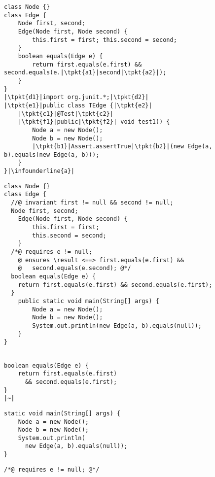 \newsavebox{\codefive}
\begin{lrbox}{\codefive}
	\begin{lstlisting}
class Node {}
class Edge {
	Node first, second;
	Edge(Node first, Node second) {
		this.first = first; this.second = second;
	}
	boolean equals(Edge e) {
		return first.equals(e.first) && second.equals(e.|\tpkt{a1}|second|\tpkt{a2}|);
	}
}
|\tpkt{d1}|import org.junit.*;|\tpkt{d2}|
|\tpkt{e1}|public class TEdge {|\tpkt{e2}|
	|\tpkt{c1}|@Test|\tpkt{c2}|
	|\tpkt{f1}|public|\tpkt{f2}| void test1() {
		Node a = new Node();
		Node b = new Node();
		|\tpkt{b1}|Assert.assertTrue|\tpkt{b2}|(new Edge(a, b).equals(new Edge(a, b)));
	}
}|\infounderline{a}|
	\end{lstlisting}
\end{lrbox}

\newsavebox{\dbc}
\begin{lrbox}{\dbc}
\begin{lstlisting}
class Node {}
class Edge {
  //@ invariant first != null && second != null;
  Node first, second;
	Edge(Node first, Node second) {
		this.first = first;
		this.second = second;
	}
  /*@ requires e != null;
    @ ensures \result <==> first.equals(e.first) &&
    @   second.equals(e.second); @*/
  boolean equals(Edge e) {
    return first.equals(e.first) && second.equals(e.first);
  }
	public static void main(String[] args) {
		Node a = new Node();
		Node b = new Node();
		System.out.println(new Edge(a, b).equals(null));
	}
}
\end{lstlisting}
\end{lrbox}

\newsavebox{\callee}
\begin{lrbox}{\callee}
\begin{lstlisting}

boolean equals(Edge e) {
	return first.equals(e.first)
	  && second.equals(e.first);
}
|~|
\end{lstlisting}
\end{lrbox}

\newsavebox{\caller}
\begin{lrbox}{\caller}
\begin{lstlisting}
static void main(String[] args) {
	Node a = new Node();
	Node b = new Node();
	System.out.println(
	  new Edge(a, b).equals(null));
}
\end{lstlisting}
\end{lrbox}

\newsavebox{\blamepre}
\begin{lrbox}{\blamepre}
\begin{lstlisting}
/*@ requires e != null; @*/
\end{lstlisting}
\end{lrbox}

